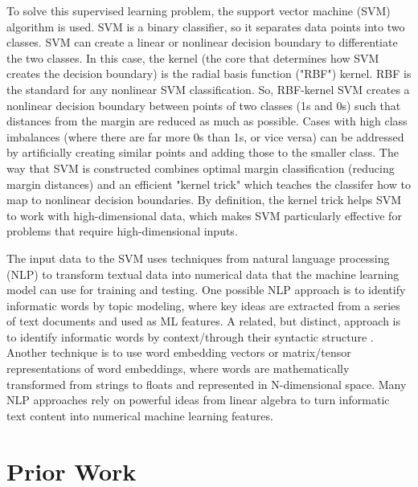 \documentclass[10pt,twocolumn]{article}
\begin{document}
To solve this supervised learning problem, the support vector machine (SVM) algorithm is used. SVM is a binary classifier, so it separates data points into two classes. SVM can create a linear or nonlinear decision boundary to differentiate the two classes. In this case, the kernel (the core that determines how SVM creates the decision boundary) is the radial basis function ("RBF") kernel. RBF is the standard for any nonlinear SVM classification. So, RBF-kernel SVM creates a nonlinear decision boundary between points of two classes (1s and 0s) such that distances from the margin are reduced as much as possible. \cite{CortesVapnikSVM} Cases with high class imbalances (where there are far more 0s than 1s, or vice versa) can be addressed by artificially creating similar points and adding those to the smaller class. \cite{NVChawla} The way that SVM is constructed combines optimal margin classification (reducing margin distances) and an efficient "kernel trick" which teaches the classifer how to map to nonlinear decision boundaries. By definition, the kernel trick helps SVM to work with high-dimensional data, which makes SVM particularly effective for problems that require high-dimensional inputs. \cite{Joachims, Berbatova} 

The input data to the SVM uses techniques from natural language processing (NLP) to transform textual data into numerical data that the machine learning model can use for training and testing. One possible NLP approach is to identify informatic words by topic modeling, where key ideas are extracted from a series of text documents and used as ML features. \cite{Ryan_51, Reuver} A related, but distinct, approach is to identify informatic words by context/through their syntactic structure \cite{Meidl, LDiCaro}. Another technique is to use word embedding vectors or matrix/tensor representations of word embeddings, where words are mathematically transformed from strings to floats and represented in N-dimensional space. \cite{Sifa_tensor} Many NLP approaches rely on powerful ideas from linear algebra to turn informatic text content into numerical machine learning features.

\section{Prior Work}

\end{document}
